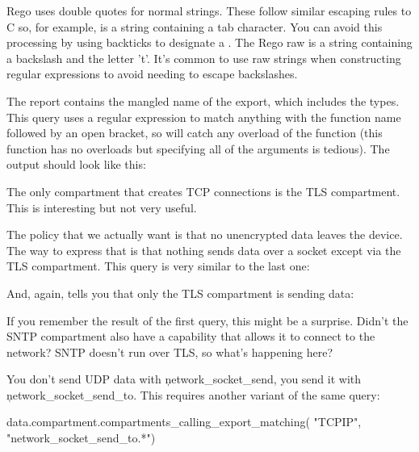 \begin{note}
	Rego uses double quotes for normal strings.
	These follow similar escaping rules to C so, for example,  is a string containing a tab character.
	You can avoid this processing by using backticks to designate a .
	The Rego raw  is a string containing a backslash and the letter 't'.
	It's common to use raw strings when constructing regular expressions to avoid needing to escape backslashes.
\end{note}

The report contains the mangled name of the export, which includes the types.
This query uses a regular expression to match anything with the function name followed by an open bracket, so will catch any overload of the function (this function has no overloads but specifying all of the arguments is tedious).
The output should look like this:

\begin{jsonsnippet}
[
  "TLS"
]
\end{jsonsnippet}

The only compartment that creates TCP connections is the TLS compartment.
This is interesting but not very useful.

The policy that we actually want is that no unencrypted data leaves the device.
The way to express that is that nothing sends data over a socket except via the TLS compartment.
This query is very similar to the last one:


And, again, tells you that only the TLS compartment is sending data:

\begin{jsonsnippet}
[
  "TLS"
]
\end{jsonsnippet}

If you remember the result of the first query, this might be a surprise.
Didn't the SNTP compartment also have a capability that allows it to connect to the network?
SNTP doesn't run over TLS, so what's happening here?

You don't send UDP data with \c{network_socket_send}, you send it with \c{network_socket_send_to}.
This requires another variant of the same query:

\begin{regosnippet}
data.compartment.compartments_calling_export_matching(
	"TCPIP",
	"network_socket_send_to.*") 
\end{regosnippet}

